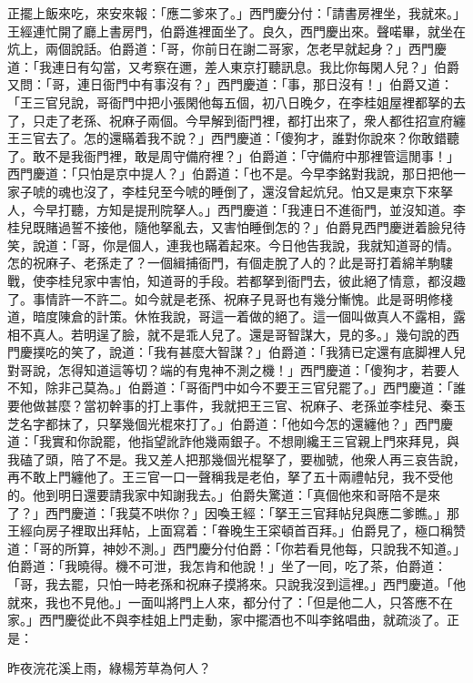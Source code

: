 正擺上飯來吃，來安來報：「應二爹來了。」西門慶分付：「請書房裡坐，我就來。」王經連忙開了廳上書房門，伯爵進裡面坐了。良久，西門慶出來。聲喏畢，就坐在炕上，兩個說話。伯爵道：「哥，你前日在謝二哥家，怎老早就起身？」西門慶道：「我連日有勾當，又考察在邇，差人東京打聽訊息。我比你每閑人兒？」伯爵又問：「哥，連日衙門中有事沒有？」西門慶道：「事，那日沒有！」伯爵又道：「王三官兒說，哥衙門中把小張閑他每五個，初八日晚夕，在李桂姐屋裡都拏的去了，只走了老孫、祝麻子兩個。今早解到衙門裡，都打出來了，衆人都徃招宣府纏王三官去了。怎的還瞞着我不說？」西門慶道：「傻狗才，誰對你說來？你敢錯聽了。敢不是我衙門裡，敢是周守備府裡？」{}伯爵道：「守備府中那裡管這閒事！」西門慶道：「只怕是京中提人？」伯爵道：「也不是。今早李銘對我說，那日把他一家子唬的魂也沒了，李桂兒至今唬的睡倒了，還沒曾起炕兒。怕又是東京下來拏人，今早打聽，方知是提刑院拏人。」西門慶道：「我連日不進衙門，並沒知道。李桂兒既賭過誓不接他，隨他拏亂去，又害怕睡倒怎的？」伯爵見西門慶迸着臉兒待笑，說道：「哥，你是個人，連我也瞞着起來。今日他告我說，我就知道哥的情。怎的祝麻子、老孫走了？一個緝捕衙門，有個走脫了人的？此是哥打着綿羊駒䮫戰，使李桂兒家中害怕，知道哥的手段。若都拏到衙門去，彼此絕了情意，都沒趣了。事情許一不許二。如今就是老孫、祝麻子見哥也有幾分慚愧。此是哥明修棧道，暗度陳倉的計策。休恠我說，哥這一着做的絕了。這一個叫做真人不露相，露相不真人。若明逞了臉，就不是乖人兒了。還是哥智謀大，見的多。」{}幾句說的西門慶撲吃的笑了，說道：「我有甚麼大智謀？」伯爵道：「我猜已定還有底脚裡人兒對哥說，怎得知道這等切？端的有鬼神不測之機！」西門慶道：「傻狗才，若要人不知，除非己莫為。」伯爵道：「哥衙門中如今不要王三官兒罷了。」西門慶道：「誰要他做甚麼？當初幹事的打上事件，我就把王三官、祝麻子、老孫並李桂兒、秦玉芝名字都抹了，只拏幾個光棍來打了。」伯爵道：「他如今怎的還纏他？」西門慶道：「我實和你說罷，他指望訛詐他幾兩銀子。不想剛纔王三官親上門來拜見，與我磕了頭，陪了不是。我又差人把那幾個光棍拏了，要枷號，他衆人再三哀告說，再不敢上門纏他了。王三官一口一聲稱我是老伯，{}拏了五十兩禮帖兒，我不受他的。他到明日還要請我家中知謝我去。」伯爵失驚道：「真個他來和哥陪不是來了？」西門慶道：「我莫不哄你？」因喚王經：「拏王三官拜帖兒與應二爹瞧。」那王經向房子裡取出拜帖，上面寫着：「眷晚生王寀頓首百拜。」伯爵見了，極口稱赞道：「哥的所算，神妙不測。」西門慶分付伯爵：「你若看見他每，只說我不知道。」伯爵道：「我曉得。機不可泄，我怎肯和他說！」坐了一囘，吃了茶，伯爵道：「哥，我去罷，只怕一時老孫和祝麻子摸將來。只說我沒到這裡。」西門慶道。「他就來，我也不見他。」{}一面叫將門上人來，都分付了：「但是他二人，只答應不在家。」西門慶從此不與李桂姐上門走動，家中擺酒也不叫李銘唱曲，就疏淡了。正是：

\begin{myquote} 
昨夜浣花溪上雨，綠楊芳草為何人？
\end{myquote} 


